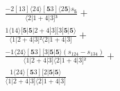 \documentclass[varwidth, border=5pt]{standalone}
\begin{document}
\begin{my}
$\begin{gathered}
\scriptscriptstyle\frac{-2[13]⟨24⟩[𝟓3]⟨2𝟓⟩s_{𝟓}}{⟨2|1+4|3]³} +\\
\scriptscriptstyle\frac{1⟨14⟩[𝟓|𝟓|2+4|3][3|𝟓|𝟓⟩}{⟨1|2+4|3]²⟨2|1+4|3]} +\\
\scriptscriptstyle\frac{-1⟨24⟩[𝟓3][3|𝟓|𝟓⟩(s_{124}-s_{134})}{⟨1|2+4|3]⟨2|1+4|3]²} +\\
\scriptscriptstyle\frac{1⟨24⟩[𝟓3][2|𝟓|𝟓⟩}{⟨1|2+4|3]⟨2|1+4|3]} \phantom{+}
\end{gathered}$
\end{my}
\end{document}
